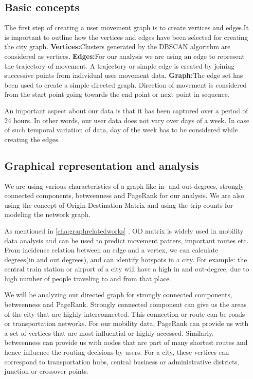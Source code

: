 \subsection{Basic concepts}\label{cha:basicConceptsGraph}The first step of creating a user movement graph is to create vertices and edges.It is important to outline how the vertices and edges have been selected for creating the city graph. \linebreak
\textbf{Vertices:}Clusters generated by the DBSCAN algorithm are considered as vertices. \linebreak
\textbf{Edges:}For our analysis we are using an edge to represent the trajectory of movement. A trajectory or simple edge is created by joining successive points from individual user movement data.
\linebreak
\textbf{Graph:}The edge set has been used to create a simple directed graph. Direction of movement is considered from the start point going towards the end point or next point in sequence.

An important aspect about our data is that it has been captured over a period of 24 hours. In other words, our user data does not vary over days of a week. In case of such temporal variation of data, day of the week has to be considered while creating the edges.

\subsection{Graphical representation and analysis}
\label{cha:graph1}
 We are using various characteristics of a graph like in- and out-degrees, strongly connected components, betweenness and PageRank \cite{page1999pagerank} for our analysis. We are also using the concept of Origin-Destination Matrix and using the trip counts for modeling the network graph. 
 
 As mentioned in \autoref{cha:graphrelatedworks} , OD matrix is widely used in mobility data analysis and can be used to predict movement patters, important routes etc. From incidence relation between an edge and a vertex, we can calculate degrees(in and out degrees), and can identify hotspots in a city. For example: the central train station or airport of a city will have a high in and out-degree, due to high number of people traveling to and from that place.

 We will be analyzing our directed graph for strongly connected components, betweenness and PageRank. Strongly connected component can give us the areas of the city that are highly interconnected. This connection or route can be roads or transportation networks. For our mobility data, PageRank can provide us with a set of vertices that are most influential or highly accessed. Similarly, betweenness can provide us with nodes that are part of many shortest routes and hence influence the routing decisions by users. For a city, these vertices can correspond to transportation hubs, central business or administrative districts, junction or crossover points.

\FloatBarrier
\FloatBarrier
